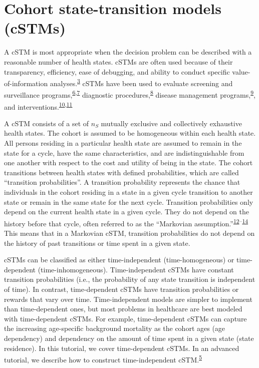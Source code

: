 \documentclass[
]{article}
\begin{document}
\hypertarget{cohort-state-transition-models-cstms}{%
\section{Cohort state-transition models (cSTMs)}\label{cohort-state-transition-models-cstms}}

A cSTM is most appropriate when the decision problem can be described with a reasonable number of health states. cSTMs are often used because of their transparency, efficiency, ease of debugging, and ability to conduct specific value-of-information analyses.\textsuperscript{\protect\hyperlink{ref-Siebert2012c}{3}} cSTMs have been used to evaluate screening and surveillance programs,\textsuperscript{\protect\hyperlink{ref-Suijkerbuijk2018}{6},\protect\hyperlink{ref-Sathianathen2018a}{7}} diagnostic procedures,\textsuperscript{\protect\hyperlink{ref-Lu2018b}{8}} disease management programs,\textsuperscript{\protect\hyperlink{ref-Djatche2018}{9}}, and interventions.\textsuperscript{\protect\hyperlink{ref-Pershing2014}{10},\protect\hyperlink{ref-Smith-Spangler2010}{11}}

A cSTM consists of a set of \(n_S\) mutually exclusive and collectively exhaustive health states. The cohort is assumed to be homogeneous within each health state. All persons residing in a particular health state are assumed to remain in the state for a cycle, have the same characteristics, and are indistinguishable from one another with respect to the cost and utility of being in the state. The cohort transitions between health states with defined probabilities, which are called ``transition probabilities''. A transition probability represents the chance that individuals in the cohort residing in a state in a given cycle transition to another state or remain in the same state for the next cycle. Transition probabilities only depend on the current health state in a given cycle. They do not depend on the history before that cycle, often referred to as the ``Markovian assumption.''\textsuperscript{\protect\hyperlink{ref-Kuntz2001}{12}--\protect\hyperlink{ref-Beck1983}{14}} This means that in a Markovian cSTM, transition probabilities do not depend on the history of past transitions or time spent in a given state.

cSTMs can be classified as either time-independent (time-homogeneous) or time-dependent (time-inhomogeneous). Time-independent cSTMs have constant transition probabilities (i.e., the probability of any state transition is independent of time). In contrast, time-dependent cSTMs have transition probabilities or rewards that vary over time. Time-independent models are simpler to implement than time-dependent ones, but most problems in healthcare are best modeled with time-dependent cSTMs. For example, time-dependent cSTMs can capture the increasing age-specific background mortality as the cohort ages (age dependency) and dependency on the amount of time spent in a given state (state residence). In this tutorial, we cover time-dependent cSTMs. In an advanced tutorial, we describe how to construct time-independent cSTM.\textsuperscript{\protect\hyperlink{ref-Alarid-Escudero2021b}{5}}
\end{document}
